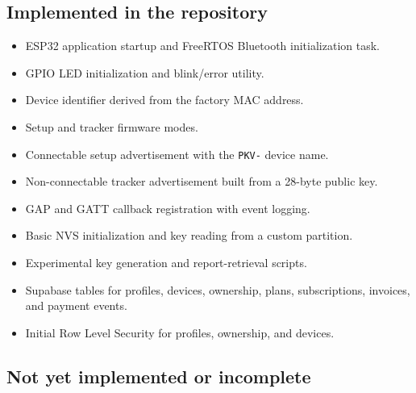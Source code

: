 \documentclass[12pt,a4paper]{article}
\newcommand{\code}[1]{\texttt{#1}}
\begin{document}
\subsection{Implemented in the repository}

\begin{itemize}
    \item ESP32 application startup and FreeRTOS Bluetooth initialization task.
    \item GPIO LED initialization and blink/error utility.
    \item Device identifier derived from the factory MAC address.
    \item Setup and tracker firmware modes.
    \item Connectable setup advertisement with the \code{PKV-} device name.
    \item Non-connectable tracker advertisement built from a 28-byte public key.
    \item GAP and GATT callback registration with event logging.
    \item Basic NVS initialization and key reading from a custom partition.
    \item Experimental key generation and report-retrieval scripts.
    \item Supabase tables for profiles, devices, ownership, plans,
    subscriptions, invoices, and payment events.
    \item Initial Row Level Security for profiles, ownership, and devices.
\end{itemize}

\subsection{Not yet implemented or incomplete}
\end{document}
